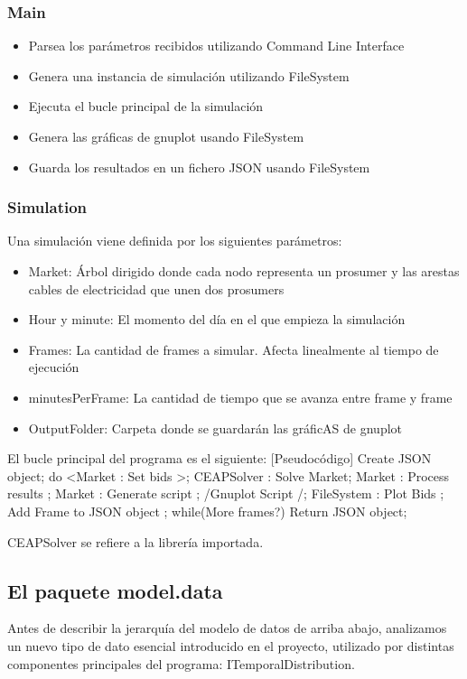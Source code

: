 \documentclass[12pt,a4paper,openright,oneside]{article}
\numberwithin{equation}{section}
\theoremstyle{definition}
\begin{document}
\subsubsection{Main}
\begin{itemize}
\item Parsea los parámetros recibidos utilizando Command Line Interface
\item Genera una instancia de simulación utilizando FileSystem
\item Ejecuta el bucle principal de la simulación
\item Genera las gráficas de gnuplot usando FileSystem
\item Guarda los resultados en un fichero JSON usando FileSystem
\end{itemize}
\subsubsection{Simulation}
Una simulación viene definida por los siguientes parámetros:
\begin{itemize}
\item Market: Árbol dirigido donde cada nodo representa un prosumer y las arestas cables de electricidad que unen dos prosumers
\item Hour y minute: El momento del día en el que empieza la simulación
\item Frames: La cantidad de frames a simular. Afecta linealmente al tiempo de ejecución
\item minutesPerFrame: La cantidad de tiempo que se avanza entre frame y frame
\item OutputFolder: Carpeta donde se guardarán las gráficAS de gnuplot
\end{itemize}
El bucle principal del programa es el siguiente:
[Pseudocódigo]
Create JSON object;
do
{
  <Market : Set bids    >;
  CEAPSolver : Solve Market;
  Market : Process results ;
  Market : Generate script ;
  /Gnuplot Script         /;
  FileSystem : Plot Bids   ;
  Add Frame to JSON object ;
}while(More frames?)
Return JSON object;

CEAPSolver se refiere a la librería importada.

\subsection{El paquete model.data}
Antes de describir la jerarquía del modelo de datos de arriba abajo, analizamos un nuevo tipo de dato esencial introducido en el proyecto, utilizado por distintas componentes principales del programa: ITemporalDistribution.
\end{document}
